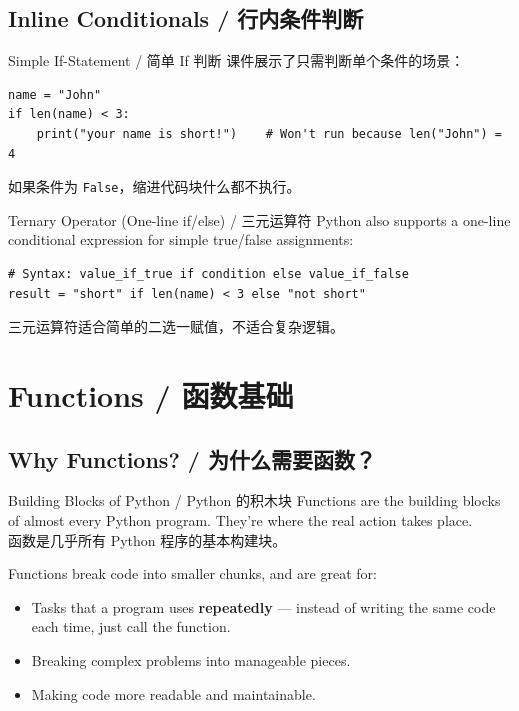 \documentclass[11pt,a4paper]{article}
\begin{document}
\subsection{Inline Conditionals / 行内条件判断}

\begin{examplebox}{Simple If-Statement / 简单 If 判断}
    课件展示了只需判断单个条件的场景：
\begin{lstlisting}
name = "John"
if len(name) < 3:
    print("your name is short!")    # Won't run because len("John") = 4
\end{lstlisting}
    如果条件为 \texttt{False}，缩进代码块什么都不执行。
\end{examplebox}

\begin{concept}{Ternary Operator (One-line if/else) / 三元运算符}
    Python also supports a one-line conditional expression for simple true/false assignments:
\begin{lstlisting}
# Syntax: value_if_true if condition else value_if_false
result = "short" if len(name) < 3 else "not short"
\end{lstlisting}
    三元运算符适合简单的二选一赋值，不适合复杂逻辑。
\end{concept}

\section{Functions / 函数基础}

\subsection{Why Functions? / 为什么需要函数？}

\begin{concept}{Building Blocks of Python / Python 的积木块}
    Functions are the building blocks of almost every Python program. They're where the real action takes place. \\
    函数是几乎所有 Python 程序的基本构建块。

    Functions break code into smaller chunks, and are great for:
    \begin{itemize}[itemsep=0.3em]
        \item Tasks that a program uses \textbf{repeatedly} — instead of writing the same code each time, just call the function.
        \item Breaking complex problems into manageable pieces.
        \item Making code more readable and maintainable.
    \end{itemize}
\end{concept}
\end{document}
